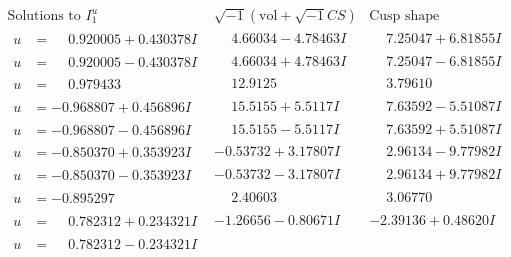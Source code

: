 \documentclass[1p]{elsarticle_modified}
\theoremstyle{definition}
\newcommand{\I}{\sqrt{-1}}
\begin{document}
$$\begin{array}{c|c|c}  
\text{Solutions to }I^u_{1}& \I (\text{vol} + \sqrt{-1}CS) & \text{Cusp shape}\\
 \hline 
\begin{aligned}
u &= \phantom{-}0.920005 + 0.430378 I\end{aligned}
 & \phantom{-}4.66034 - 4.78463 I & \phantom{-}7.25047 + 6.81855 I \\ \hline\begin{aligned}
u &= \phantom{-}0.920005 - 0.430378 I\end{aligned}
 & \phantom{-}4.66034 + 4.78463 I & \phantom{-}7.25047 - 6.81855 I \\ \hline\begin{aligned}
u &= \phantom{-}0.979433\phantom{ +0.000000I}\end{aligned}
 & \phantom{-}12.9125\phantom{ +0.000000I} & \phantom{-}3.79610\phantom{ +0.000000I} \\ \hline\begin{aligned}
u &= -0.968807 + 0.456896 I\end{aligned}
 & \phantom{-}15.5155 + 5.5117 I & \phantom{-}7.63592 - 5.51087 I \\ \hline\begin{aligned}
u &= -0.968807 - 0.456896 I\end{aligned}
 & \phantom{-}15.5155 - 5.5117 I & \phantom{-}7.63592 + 5.51087 I \\ \hline\begin{aligned}
u &= -0.850370 + 0.353923 I\end{aligned}
 & -0.53732 + 3.17807 I & \phantom{-}2.96134 - 9.77982 I \\ \hline\begin{aligned}
u &= -0.850370 - 0.353923 I\end{aligned}
 & -0.53732 - 3.17807 I & \phantom{-}2.96134 + 9.77982 I \\ \hline\begin{aligned}
u &= -0.895297\phantom{ +0.000000I}\end{aligned}
 & \phantom{-}2.40603\phantom{ +0.000000I} & \phantom{-}3.06770\phantom{ +0.000000I} \\ \hline\begin{aligned}
u &= \phantom{-}0.782312 + 0.234321 I\end{aligned}
 & -1.26656 - 0.80671 I & -2.39136 + 0.48620 I \\ \hline\begin{aligned}
u &= \phantom{-}0.782312 - 0.234321 I\end{aligned}

\end{array}$$
\end{document}
